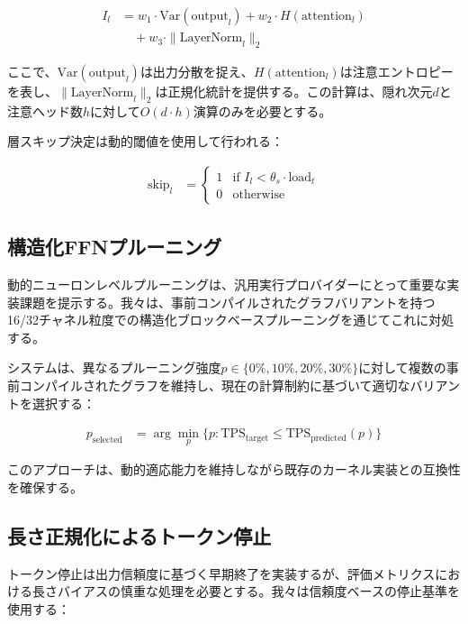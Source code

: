 \documentclass[10pt,twocolumn,a4paper]{jarticle}
\begin{document}
\begin{align}
I_l &= w_1 \cdot \text{Var}(\text{output}_l) + w_2 \cdot H(\text{attention}_l) \nonumber \\
&\quad + w_3 \cdot \|\text{LayerNorm}_l\|_2 \label{eq:importance}
\end{align}

ここで、$\text{Var}(\text{output}_l)$は出力分散を捉え、$H(\text{attention}_l)$は注意エントロピーを表し、$\|\text{LayerNorm}_l\|_2$は正規化統計を提供する。この計算は、隠れ次元$d$と注意ヘッド数$h$に対して$O(d \cdot h)$演算のみを必要とする。

層スキップ決定は動的閾値を使用して行われる：

\begin{align}
\text{skip}_l &= \begin{cases}
1 & \text{if } I_l < \theta_s \cdot \text{load}_t \\
0 & \text{otherwise}
\end{cases} \label{eq:layer_skip}
\end{align}

\subsection{構造化FFNプルーニング}

動的ニューロンレベルプルーニングは、汎用実行プロバイダーにとって重要な実装課題を提示する。我々は、事前コンパイルされたグラフバリアントを持つ16/32チャネル粒度での構造化ブロックベースプルーニングを通じてこれに対処する。

システムは、異なるプルーニング強度$p \in \{0\%, 10\%, 20\%, 30\%\}$に対して複数の事前コンパイルされたグラフを維持し、現在の計算制約に基づいて適切なバリアントを選択する：

\begin{align}
p_{\text{selected}} &= \arg\min_{p} \{p : \text{TPS}_{\text{target}} \leq \text{TPS}_{\text{predicted}}(p)\} \label{eq:ffn_selection}
\end{align}

このアプローチは、動的適応能力を維持しながら既存のカーネル実装との互換性を確保する。

\subsection{長さ正規化によるトークン停止}

トークン停止は出力信頼度に基づく早期終了を実装するが、評価メトリクスにおける長さバイアスの慎重な処理を必要とする。我々は信頼度ベースの停止基準を使用する：
\end{document}
